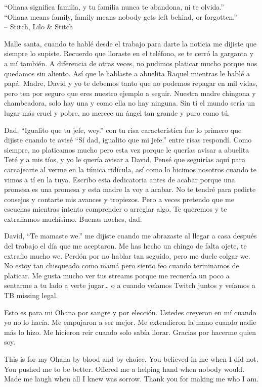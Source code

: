 \begin{frontmatter}[Dedication]

    \centering
    ``Ohana significa familia, y tu familia nunca te abandona, ni te olvida.''\\
    ``Ohana means family, family means nobody gets left behind, or forgotten.''\\
    -- Stitch, Lilo \& Stitch

    \justify
    Malle santa, cuando te hablé desde el trabajo para darte la noticia me dijiste que siempre lo supiste. Recuerdo que lloraste en el teléfono, se te cerró la garganta y a mí también. A diferencia de otras veces, no pudimos platicar mucho porque nos quedamos sin aliento. Así que le hablaste a abuelita Raquel mientras le hablé a papá. Madre, David y yo te debemos tanto que no podemos repagar en mil vidas, pero ten por seguro que eres nuestro ejemplo a seguir. Nuestra madre chingona y chambeadora, solo hay una y como ella no hay ninguna. Sin tí el mundo sería un lugar más cruel y pobre, no merece un ángel tan grande y puro como tú.

    Dad, ``Igualito que tu jefe, wey.'' con tu risa característica fue lo primero que dijiste cuando te avisé ``Sí dad, igualito que mi jefe.'' entre risas respondí. Como siempre, no platicamos mucho pero esta vez porque le querías avisar a abuelita Teté y a mis tíos, y yo le quería avisar a David. Pensé que seguirías aquí para carcajearte al verme en la túnica ridícula, así como lo hicimos nosotros cuando te vimos a tí en la tuya. Escribo esta dedicatoria antes de acabar porque una promesa es una promesa y esta madre la voy a acabar. No te tendré para pedirte consejos y contarte mis avances y tropiezos. Pero a veces pretendo que me escuchas mientras intento comprender o arreglar algo. Te queremos y te extrañamos muchísimo. Buenas noches, dad.

    David, ``Te mamaste we.'' me dijiste cuando me abrazaste al llegar a casa después del trabajo el día que me aceptaron. Me has hecho un chingo de falta ojete, te extraño mucho we. Perdón por no hablar tan seguido, pero me duele colgar we. No estoy tan chisqueado como mamá pero siento feo cuando terminamos de platicar. Me gusta mucho ver tus streams porque me recuerda un poco a sentarme a tu lado a verte jugar\ldots{} o a cuando veíamos Twitch juntos y veíamos a TB missing legal.

    Esto es para mi Ohana por sangre y por elección. Ustedes creyeron en mí cuando yo no lo hacía. Me empujaron a ser mejor. Me extendieron la mano cuando nadie más lo hizo. Me hicieron reir cuando solo sabía llorar. Gracias por hacerme quien soy.

    This is for my Ohana by blood and by choice. You believed in me when I did not. You pushed me to be better. Offered me a helping hand when nobody would. Made me laugh when all I knew was sorrow. Thank you for making me who I am.
\end{frontmatter}

